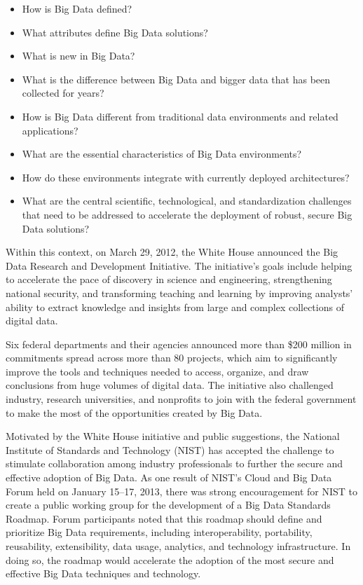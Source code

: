 \begin{itemize}

\item	How is Big Data defined?

\item	What attributes define Big Data solutions? 

\item	What is new in Big Data?

\item What is the difference between Big Data and bigger data that has
been collected for years?

\item	How is Big Data different from traditional data environments and related applications? 

\item	What are the essential characteristics of Big Data environments? 

\item	How do these environments integrate with currently deployed architectures? 

\item What are the central scientific, technological, and
standardization challenges that need to be addressed to accelerate the
deployment of robust, secure Big Data solutions?

\end{itemize}

Within this context, on March 29, 2012, the White House announced the
Big Data Research and Development Initiative. The initiative's goals
include helping to accelerate the pace of discovery in science and
engineering, strengthening national security, and transforming
teaching and learning by improving analysts' ability to extract
knowledge and insights from large and complex collections of digital
data.

Six federal departments and their agencies announced more than \$200
million in commitments spread across more than 80 projects, which aim
to significantly improve the tools and techniques needed to access,
organize, and draw conclusions from huge volumes of digital data. The
initiative also challenged industry, research universities, and
nonprofits to join with the federal government to make the most of the
opportunities created by Big Data.

Motivated by the White House initiative and public suggestions, the
National Institute of Standards and Technology (NIST) has accepted the
challenge to stimulate collaboration among industry professionals to
further the secure and effective adoption of Big Data. As one result
of NIST's Cloud and Big Data Forum held on January 15–17, 2013, there
was strong encouragement for NIST to create a public working group for
the development of a Big Data Standards Roadmap. Forum participants
noted that this roadmap should define and prioritize Big Data
requirements, including interoperability, portability, reusability,
extensibility, data usage, analytics, and technology infrastructure.
In doing so, the roadmap would accelerate the adoption of the most
secure and effective Big Data techniques and technology.

